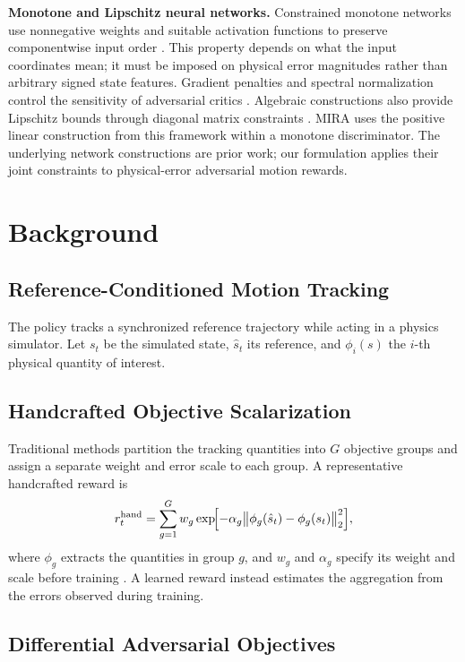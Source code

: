 \documentclass[letterpaper, 10pt, conference]{ieeeconf}
\begin{document}
\textbf{Monotone and Lipschitz neural networks.} Constrained monotone
networks use nonnegative weights and suitable activation functions to
preserve componentwise input order \cite{runje2023constrained}. This
property depends on what the input coordinates mean; it must be imposed
on physical error magnitudes rather than arbitrary signed state features.
Gradient penalties and spectral normalization control the sensitivity of
adversarial critics \cite{gulrajani2017improved,miyato2018spectral}.
Algebraic constructions also provide Lipschitz bounds through diagonal
matrix constraints \cite{araujo2023unified}. MIRA uses the positive linear
construction from this framework within a monotone discriminator. The
underlying network constructions are prior work; our formulation applies
their joint constraints to physical-error adversarial motion rewards.

\section{Background}
\subsection{Reference-Conditioned Motion Tracking}
The policy tracks a synchronized reference trajectory while acting in
a physics simulator. Let $s_t$ be the simulated state, $\hat{s}_t$ its
reference, and $\phi_i(s)$ the $i$-th physical quantity of interest.

\subsection{Handcrafted Objective Scalarization}
Traditional methods partition the tracking quantities into $G$ objective
groups and assign a separate weight and error scale to each group. A
representative handcrafted reward is
\begin{equation}
r_t^{\mathrm{hand}}
=\sum_{g=1}^{G} w_g
\exp\!\Bigl[-\alpha_g
\bigl\|\phi_g(\hat{s}_t)-\phi_g(s_t)\bigr\|_2^2\Bigr],
\label{eq:hand}
\end{equation}
where $\phi_g$ extracts the quantities in group $g$, and $w_g$ and
$\alpha_g$ specify its weight and scale before training
\cite{peng2018deepmimic}. A learned reward instead estimates the
aggregation from the errors observed during training.

\subsection{Differential Adversarial Objectives}
\label{sec:learned}
\end{document}

